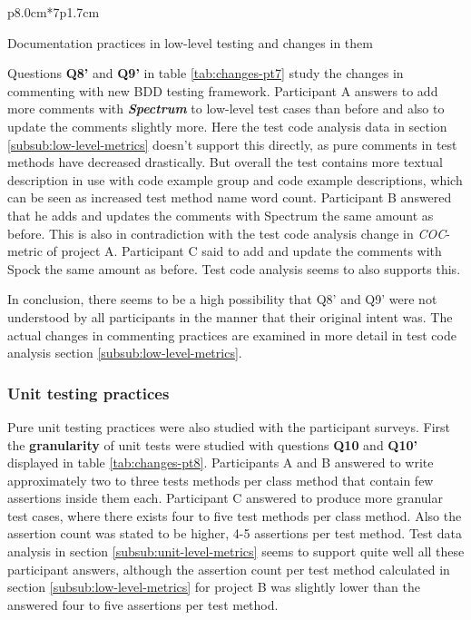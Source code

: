 \begin{table}[H]
{\begin{tttabular}{p{8.0cm}*{7}{p{1.7cm}}}
            \end{tttabular}}
            \caption {Documentation practices in low-level testing and changes in them} \label{tab:changes-pt7}
    \end{table}

Questions \textbf{Q8'} and \textbf{Q9'} in table \ref{tab:changes-pt7} study the changes in commenting with new BDD testing framework.
Participant A answers to add more comments with \textbf{\textit{Spectrum}} to low-level test cases
than before and also to update the comments slightly more.
Here the test code analysis data in section \ref{subsub:low-level-metrics} doesn't support this directly, as pure comments
in test methods have decreased drastically. But overall
the test contains more textual description in use with code example group and code example descriptions, which can be seen
as increased test method name word count. Participant B answered that he adds and updates the comments with Spectrum the same amount as before.
This is also in contradiction with the test code analysis change in \textit{COC}-metric of project A. Participant C said to add and
update the comments with Spock the same amount as before. Test code analysis seems to also supports this.

In conclusion, there seems to be a high possibility
that Q8' and Q9' were not understood by all participants in the manner that their original intent was. The actual changes
in commenting practices are examined in more detail in test code analysis section \ref{subsub:low-level-metrics}.

\subsubsection{Unit testing practices}
Pure unit testing practices were also studied with the participant surveys. First the \textbf{granularity} of unit tests were
studied with questions \textbf{Q10} and \textbf{Q10'} displayed in table \ref{tab:changes-pt8}. Participants A and B answered
to write approximately two to three tests methods per class method that contain few assertions inside them each. Participant
C answered to produce more granular test cases, where there exists four to five test methods per class method.
Also the assertion count was stated to be higher, 4-5 assertions per test method. Test data analysis in section \ref{subsub:unit-level-metrics}
seems to support quite well all these participant answers, although the assertion count per test method calculated in section \ref{subsub:low-level-metrics}
for project B was slightly lower than the answered four to five assertions per test method.

